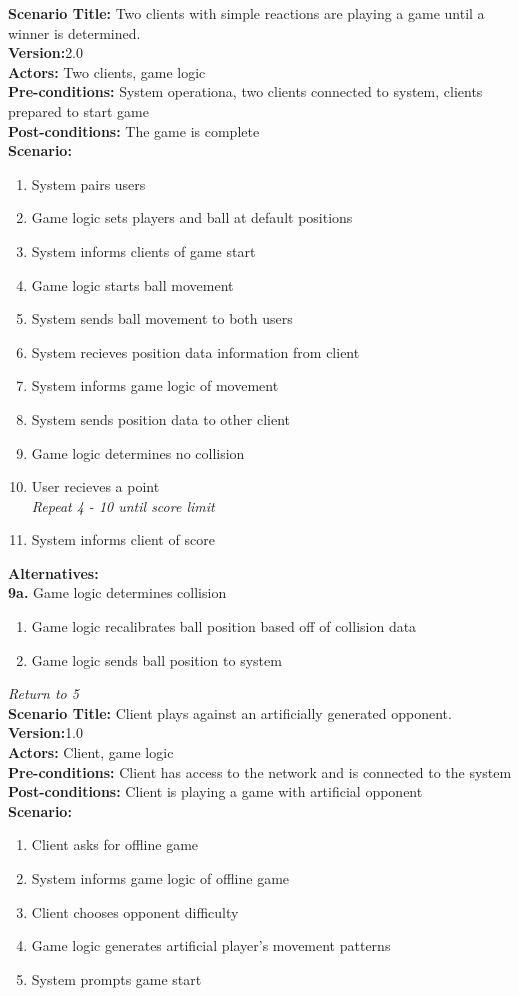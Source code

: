 \documentclass[letterpaper,12pt]{article}
\begin{document}
\noindent \textbf{Scenario Title:} Two clients with simple reactions are playing a game until a winner is determined. \\
\textbf{Version:}2.0\\
\textbf{Actors:} Two clients, game logic\\
\textbf{Pre-conditions:} System operationa, two clients connected to system, clients prepared to start game\\
\textbf{Post-conditions:} The game is complete\\
\textbf{Scenario:}
\begin{enumerate}
\item System pairs users
\item Game logic sets players and ball at default positions
\item System informs clients of game start
\item Game logic starts ball movement
\item System sends ball movement to both users
\item System recieves position data information from client
\item System informs game logic of movement
\item System sends position data to other client
\item Game logic determines no collision
\item User recieves a point\\ 
 \emph{Repeat 4 - 10 until score limit}
\item System informs client of score
\end{enumerate}
\textbf{Alternatives:}\\
\textbf{9a.} Game logic determines collision
\begin{enumerate}
\item Game logic recalibrates ball position based off of collision data
\item Game logic sends ball position to system
\end{enumerate}
\emph{Return to 5}\\


\noindent \textbf{Scenario Title:} Client plays against an artificially generated opponent.\\
\textbf{Version:}1.0\\
\textbf{Actors:} Client, game logic\\
\textbf{Pre-conditions:} Client has access to the network and is connected to the system\\
\textbf{Post-conditions:} Client is playing a game with artificial opponent\\
\textbf{Scenario:}
\begin{enumerate}
\item Client asks for offline game
\item System informs game logic of offline game
\item Client chooses opponent difficulty
\item Game logic generates artificial player's movement patterns
\item System prompts game start
\end{enumerate}
\end{document}
